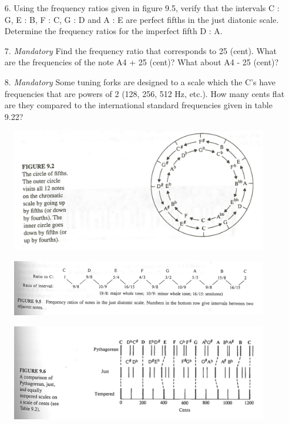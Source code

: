\documentclass{article}
\begin{document}
\begin{itemize}
    \item[6.]  Using the frequency ratios given in figure 9.5, verify that the intervals C : G, E : B, F : C, G : D and A : E are perfect fifths in the just diatonic scale. Determine the frequency ratios for the imperfect fifth D : A. 

    \item[7.] \textit{Mandatory}  Find the frequency ratio that corresponds to 25 (cent). What are the frequencies of the note A4 + 25 (cent)? What about A4 - 25 (cent)?  
    
    \item[8.] \textit{Mandatory} Some tuning forks are designed to a scale which the C's have frequencies that are powers of 2 (128, 256, 512 Hz, etc.). How many cents flat are they compared to the international standard frequencies given in table 9.22?
    

\end{itemize}


\begin{figure}[H]
    \centering
    \includegraphics{figures/oving9_1.png}
    \label{fig:1}
\end{figure}

\begin{figure}[H]
    \centering
    \includegraphics[scale=1.5]{figures/oving9_4.png}
\end{figure}

\begin{figure}[H]
    \centering
    \includegraphics{figures/oving9_2.png}
    \label{fig:2}
\end{figure}
\end{document}

